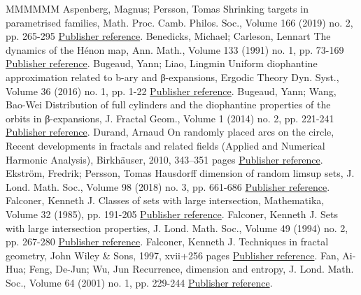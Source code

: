 \begin{thebibliography}{MMMMMM}
 Aspenberg, Magnus; Persson, Tomas Shrinking targets in parametrised families, Math. Proc. Camb. Philos. Soc., Volume 166 (2019) no. 2, pp. 265-295 \href{https://ahl.centre-mersenne.org/item/AHL_2019__2__1_0/#aspenbergpersson}{Publisher reference}.
 Benedicks, Michael; Carleson, Lennart The dynamics of the Hénon map, Ann. Math., Volume 133 (1991) no. 1, pp. 73-169 \href{https://ahl.centre-mersenne.org/item/AHL_2019__2__1_0/#benedickscarleson}{Publisher reference}.
 Bugeaud, Yann; Liao, Lingmin Uniform diophantine approximation related to b-ary and β-expansions, Ergodic Theory Dyn. Syst., Volume 36 (2016) no. 1, pp. 1-22 \href{https://ahl.centre-mersenne.org/item/AHL_2019__2__1_0/#bugeaudliao}{Publisher reference}.
 Bugeaud, Yann; Wang, Bao-Wei Distribution of full cylinders and the diophantine properties of the orbits in β-expansions, J. Fractal Geom., Volume 1 (2014) no. 2, pp. 221-241 \href{https://ahl.centre-mersenne.org/item/AHL_2019__2__1_0/#bugeaudwang}{Publisher reference}.
 Durand, Arnaud On randomly placed arcs on the circle, Recent developments in fractals and related fields (Applied and Numerical Harmonic Analysis), Birkhäuser, 2010, 343–351 pages \href{https://ahl.centre-mersenne.org/item/AHL_2019__2__1_0/#durand}{Publisher reference}.
 Ekström, Fredrik; Persson, Tomas Hausdorff dimension of random limsup sets, J. Lond. Math. Soc., Volume 98 (2018) no. 3, pp. 661-686 \href{https://ahl.centre-mersenne.org/item/AHL_2019__2__1_0/#ekstrompersson}{Publisher reference}.
 Falconer, Kenneth J. Classes of sets with large intersection, Mathematika, Volume 32 (1985), pp. 191-205 \href{https://ahl.centre-mersenne.org/item/AHL_2019__2__1_0/#falconer1}{Publisher reference}.
 Falconer, Kenneth J. Sets with large intersection properties, J. Lond. Math. Soc., Volume 49 (1994) no. 2, pp. 267-280 \href{https://ahl.centre-mersenne.org/item/AHL_2019__2__1_0/#falconer2}{Publisher reference}.
 Falconer, Kenneth J. Techniques in fractal geometry, John Wiley \& Sons, 1997, xvii+256 pages \href{https://ahl.centre-mersenne.org/item/AHL_2019__2__1_0/#falconertechniques}{Publisher reference}.
 Fan, Ai-Hua; Feng, De-Jun; Wu, Jun Recurrence, dimension and entropy, J. Lond. Math. Soc., Volume 64 (2001) no. 1, pp. 229-244 \href{https://ahl.centre-mersenne.org/item/AHL_2019__2__1_0/#fanfengwu}{Publisher reference}.

\end{thebibliography}
